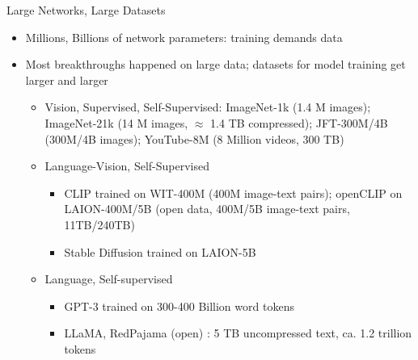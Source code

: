 \begin{frame}{Large Networks, Large Datasets}
\protect\hypertarget{large-networks-large-datasets-3}{}
\begin{itemize}
\tightlist
\item
  Millions, Billions of network parameters: training demands data
\item
  Most breakthroughs happened on large data; datasets for model training
  get larger and larger

  \begin{itemize}
  \tightlist
  \item
    Vision, Supervised, Self-Supervised: ImageNet-1k (1.4 M images);
    ImageNet-21k (14 M images, \(\approx\) 1.4 TB compressed);
    JFT-300M/4B (300M/4B images); YouTube-8M (8 Million videos, 300 TB)
  \item
    Language-Vision, Self-Supervised

    \begin{itemize}
    \tightlist
    \item
      CLIP trained on WIT-400M (400M image-text pairs); openCLIP on
      LAION-400M/5B (open data, 400M/5B image-text pairs, 11TB/240TB)
    \item
      Stable Diffusion trained on LAION-5B
    \end{itemize}
  \item
    Language, Self-supervised

    \begin{itemize}
    \tightlist
    \item
      GPT-3 trained on 300-400 Billion word tokens
    \item
      LLaMA, RedPajama (open) : 5 TB uncompressed text, ca. 1.2 trillion
      tokens
    \end{itemize}
  \end{itemize}
\end{itemize}

\end{frame}

